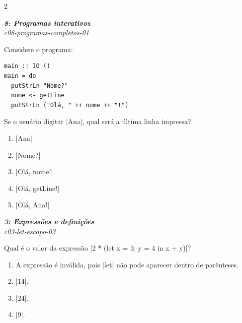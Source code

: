 \documentclass[a4paper,10pt,brazil]{article}
\begin{document}
\begin{multicols}{2}
\begin{enumerate}
\end{enumerate}

\begin{flushright}
  \footnotesize
  \textit{\textbf{8: Programas interativos}}\\
  \textit{c08-programas-completos-01}\\

\end{flushright}
Considere o programa:

\begin{verbatim}
main :: IO ()
main = do
  putStrLn "Nome?"
  nome <- getLine
  putStrLn ("Olá, " ++ nome ++ "!")
\end{verbatim}

Se o usuário digitar \haskellinline|Ana|, qual será a última linha impressa?

\begin{enumerate}
  \item \haskellinline|Ana|

  \item \haskellinline|Nome?|

  \item \haskellinline|Olá, nome!|

  \item \haskellinline|Olá, getLine!|

  \item \haskellinline|Olá, Ana!|


\end{enumerate}

\begin{flushright}
  \footnotesize
  \textit{\textbf{3: Expressões e definições}}\\
  \textit{c03-let-escopo-03}\\

\end{flushright}
Qual é o valor da expressão \haskellinline|2 * (let x = 3; y = 4 in x + y)|?

\begin{enumerate}
  \item A expressão é inválida, pois \haskellinline|let| não pode aparecer dentro de parênteses.

  \item \haskellinline|14|.

  \item \haskellinline|24|.

  \item \haskellinline|9|.


\end{enumerate}
\end{multicols}
\end{document}
